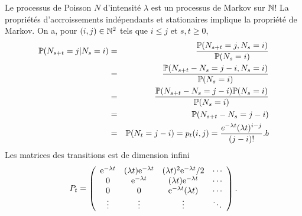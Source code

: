\begin{ex}
Le processus de Poisson $N$ d'intensité $\lambda$ est un processus de Markov sur $\mathbb{N}$! La propriétés d'accroissements indépendants et stationaires implique la propriété de Markov. On a, pour $(i,j)\in \mathbb{N}^2$ tels que  $i\leq j$ et $s,t\geq 0$,
\begin{eqnarray*}
\mathbb{P}(N_{s+t} = j|N_s =i)&=&\frac{\mathbb{P}(N_{s+t} = j,N_s =i)}{\mathbb{P}(N_s =i)}\\
&=&\frac{\mathbb{P}(N_{s+t} - N_s = j-i, N_s =i)}{\mathbb{P}(N_s =i)}\\
&=&\frac{\mathbb{P}(N_{s+t} - N_s = j-i)\mathbb{P}(N_s =i)}{\mathbb{P}(N_s =i)}\\
&=&\mathbb{P}(N_{s+t} - N_s = j-i)\\
&=&\mathbb{P}(N_{t} = j-i) = p_t(i,j) = \frac{e^{-\lambda t}(\lambda t)^{i-j}}{(j-i)!}.b\\
\end{eqnarray*} 
Les matrices des transitions est de dimension infini 
$$
P_t = \left(
\begin{array}{cccc}
\mathrm{e}^{-\lambda t}&(\lambda t)\mathrm{e}^{-\lambda t}&(\lambda t)^2\mathrm{e}^{-\lambda t}/2&\cdots\\
0&\mathrm{e}^{-\lambda t}&(\lambda t)\mathrm{e}^{-\lambda t}&\cdots\\
0&0&\mathrm{e}^{-\lambda t}(\lambda t)&\cdots\\
\vdots&\vdots&\vdots&\ddots
\end{array}
\right).
$$
\end{ex}
